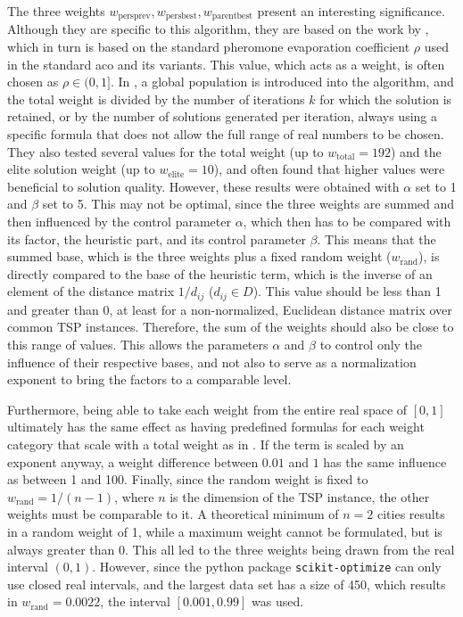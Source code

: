 The three weights $w_{\text{persprev}}, w_{\text{persbest}}, w_{\text{parentbest}}$ present an interesting significance. Although they are specific to this algorithm, they are based on the work by \citet{lin2015simple}, which in turn is based on the standard pheromone evaporation coefficient $\rho$ used in the standard \glsdesc{aco} and its variants. This value, which acts as a weight, is often chosen as $\rho \in (0,1]$. In \cite{lin2015simple}, a global population is introduced into the algorithm, and the total weight is divided by the number of iterations $k$ for which the solution is retained, or by the number of solutions generated per iteration, always using a specific formula that does not allow the full range of real numbers to be chosen. They also tested several values for the total weight (up to $w_\text{total} = 192$) and the elite solution weight (up to $w_\text{elite} = 10$), and often found that higher values were beneficial to solution quality. However, these results were obtained with $\alpha$ set to 1 and $\beta$ set to 5. This may not be optimal, since the three weights are summed and then influenced by the control parameter $\alpha$, which then has to be compared with its factor, the heuristic part, and its control parameter $\beta$. This means that the summed base, which is the three weights plus a fixed random weight ($w_\text{rand}$), is directly compared to the base of the heuristic term, which is the inverse of an element of the distance matrix $1 / d_{ij}$ ($d_{ij} \in D$). This value should be less than 1 and greater than 0, at least for a non-normalized, Euclidean distance matrix over common TSP instances. Therefore, the sum of the weights should also be close to this range of values. This allows the parameters $\alpha$ and $\beta$ to control only the influence of their respective bases, and not also to serve as a normalization exponent to bring the factors to a comparable level.

Furthermore, being able to take each weight from the entire real space of $[0,1]$ ultimately has the same effect as having predefined formulas for each weight category that scale with a total weight as in \cite{lin2015simple}. If the term is scaled by an exponent anyway, a weight difference between $0.01$ and $1$ has the same influence as between 1 and 100. Finally, since the random weight is fixed to $w_\text{rand} = 1/(n-1)$, where $n$ is the dimension of the TSP instance, the other weights must be comparable to it. A theoretical minimum of $n = 2$ cities results in a random weight of 1, while a maximum weight cannot be formulated, but is always greater than 0. This all led to the three weights being drawn from the real interval $(0, 1)$. However, since the python package \texttt{scikit-optimize} can only use closed real intervals, and the largest data set has a size of 450, which results in $w_\text{rand} = 0.0022$, the interval $[0.001,0.99]$ was used.

